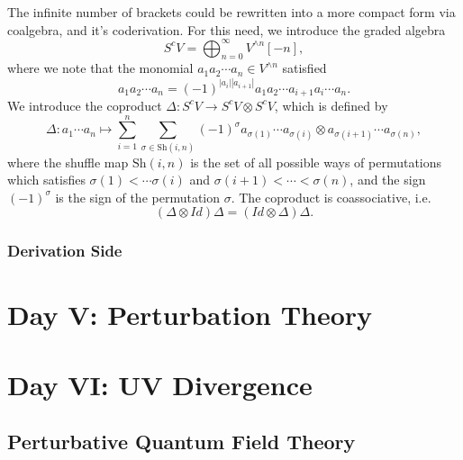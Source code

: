 \documentclass[10pt]{article}
\begin{document}
The infinite number of brackets could be rewritten into a more compact form via coalgebra, and it's coderivation. For this need, we introduce the graded algebra
\begin{equation*}
  S^{c} V = \bigoplus_{n=0}^{\infty} V^{\wedge n}[-n],
\end{equation*}
where we note that the monomial $ a_1 a_2\cdots a_n \in V^{\wedge n}$ satisfied
\begin{equation*}
  a_1 a_2 \cdots a_n = (-1)^{\left| a_i \right| \left| a_{i+1} \right|} a_1 a_2 \cdots a_{i+1} a_i \cdots a_n.
\end{equation*}
We introduce the coproduct $ \Delta : S^{c} V \rightarrow S^{c} V \otimes S^{c} V$, which is defined by
\begin{equation*}
  \Delta : a_1 \cdots a_n \mapsto \sum_{i=1}^{n} \sum_{\sigma \in \mathrm{Sh}(i,n)} (-1)^{\sigma} a_{\sigma(1)} \cdots a_{\sigma(i)} \otimes a_{\sigma(i+1)} \cdots a_{\sigma(n)},
\end{equation*}
where the shuffle map $ \mathrm{Sh}(i,n)$ is the set of all possible ways of permutations which satisfies $ \sigma(1) < \cdots \sigma(i)$ and $ \sigma(i+1) < \cdots < \sigma(n)$,
and the sign $ (-1)^{\sigma}$ is the sign of the permutation $\sigma$.
The coproduct is coassociative, i.e.
\begin{equation*}
  (\Delta \otimes Id) \Delta = (Id \otimes \Delta) \Delta.
\end{equation*}

\subsubsection{Derivation Side}

\section{Day V: Perturbation Theory}

\section{Day VI: UV Divergence}

\subsection{Perturbative Quantum Field Theory}
\end{document}
